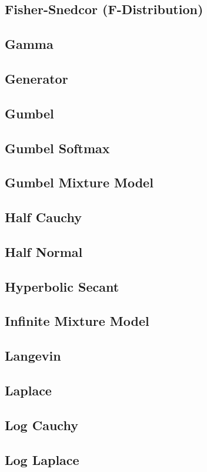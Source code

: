 \subsection{Fisher-Snedcor (F-Distribution)}
\subsection{Gamma}
\subsection{Generator}
\subsection{Gumbel}
\subsection{Gumbel Softmax}
\subsection{Gumbel Mixture Model}
\subsection{Half Cauchy}
\subsection{Half Normal}
\subsection{Hyperbolic Secant}
\subsection{Infinite Mixture Model}
\subsection{Langevin}
\subsection{Laplace}
\subsection{Log Cauchy}
\subsection{Log Laplace}
